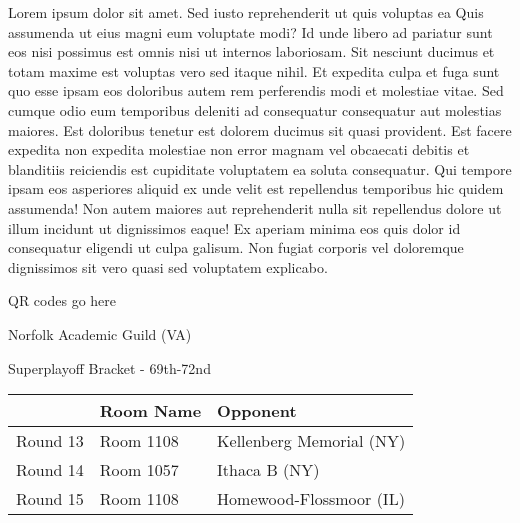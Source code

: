 \documentclass{article}%
\begin{document}
\vspace*{8pt}%
\linebreak%
\newline%
\newline%
Lorem ipsum dolor sit amet. Sed iusto reprehenderit ut quis voluptas ea Quis assumenda ut eius magni eum voluptate modi? Id unde libero ad pariatur sunt eos nisi possimus est omnis nisi ut internos laboriosam. Sit nesciunt ducimus et totam maxime est voluptas vero sed itaque nihil. Et expedita culpa et fuga sunt quo esse ipsam eos doloribus autem rem perferendis modi et molestiae vitae.\newline%
\newline%
Sed cumque odio eum temporibus deleniti ad consequatur consequatur aut molestias maiores. Est doloribus tenetur est dolorem ducimus sit quasi provident. Est facere expedita non expedita molestiae non error magnam vel obcaecati debitis et blanditiis reiciendis est cupiditate voluptatem ea soluta consequatur. Qui tempore ipsam eos asperiores aliquid ex unde velit est repellendus temporibus hic quidem assumenda!\newline%
\newline%
Non autem maiores aut reprehenderit nulla sit repellendus dolore ut illum incidunt ut dignissimos eaque! Ex aperiam minima eos quis dolor id consequatur eligendi ut culpa galisum. Non fugiat corporis vel doloremque dignissimos sit vero quasi sed voluptatem explicabo.\newline%
\newline%
%
\vspace*{30pt}%
\begin{center}%
\begin{Huge}%
QR codes go here%
\end{Huge}%
\end{center}%
\newpage%
\begin{center}%
\begin{Huge}%
Norfolk Academic Guild (VA)%
\end{Huge}%
\vspace*{8pt}%
\linebreak%
\begin{Large}%
Superplayoff Bracket {-} 69th{-}72nd%
\end{Large}%
\end{center}%
%
\begin{tabularx}{\textwidth}{|c|Y|Y|}%
\hline%
&Room Name&Opponent\\%
\hline%
Round 13&Room 1108&Kellenberg Memorial (NY)\\%
Round 14&Room 1057&Ithaca B (NY)\\%
Round 15&Room 1108&Homewood{-}Flossmoor (IL)\\%
\hline%
\end{tabularx}%
\end{document}
